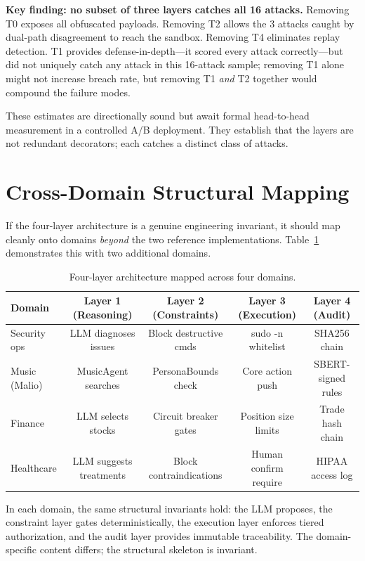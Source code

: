 \documentclass[letterpaper]{article}
\begin{document}
\textbf{Key finding: no subset of three layers catches all 16 attacks.}
Removing T0 exposes all obfuscated payloads.  Removing T2 allows the 3 attacks
caught by dual-path disagreement to reach the sandbox.  Removing T4 eliminates
replay detection.  T1 provides defense-in-depth---it scored every attack
correctly---but did not uniquely catch any attack in this 16-attack sample;
removing T1 alone might not increase breach rate, but removing T1 \textit{and}
T2 together would compound the failure modes.

These estimates are directionally sound but await formal head-to-head
measurement in a controlled A/B deployment.  They establish that the layers
are not redundant decorators; each catches a distinct class of attacks.

\section{Cross-Domain Structural Mapping}

If the four-layer architecture is a genuine engineering invariant, it should
map cleanly onto domains \textit{beyond} the two reference implementations.
Table~\ref{tab:crossdomain} demonstrates this with two additional domains.

\begin{table}[h]
\centering
\caption{Four-layer architecture mapped across four domains.}
\label{tab:crossdomain}
\begin{tabular}{lcccc}
\toprule
Domain & Layer 1 (Reasoning) & Layer 2 (Constraints) & Layer 3 (Execution) & Layer 4 (Audit) \\
\midrule
Security ops & LLM diagnoses issues & Block destructive cmds & sudo -n whitelist & SHA256 chain \\
Music (Malio) & MusicAgent searches & PersonaBounds check & Core action push & SBERT-signed rules \\
Finance & LLM selects stocks & Circuit breaker gates & Position size limits & Trade hash chain \\
Healthcare & LLM suggests treatments & Block contraindications & Human confirm require & HIPAA access log \\
\bottomrule
\end{tabular}
\end{table}

In each domain, the same structural invariants hold: the LLM proposes, the
constraint layer gates deterministically, the execution layer enforces
tiered authorization, and the audit layer provides immutable traceability.
The domain-specific content differs; the structural skeleton is invariant.
\end{document}
